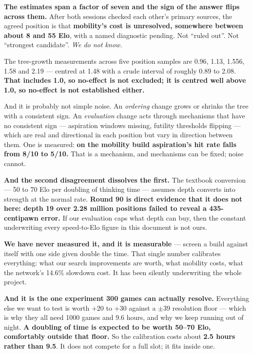 \documentclass[11pt,a4paper]{article}
\begin{document}
\textbf{The estimates span a factor of seven and the sign of the answer flips across them.}
After both sessions checked each other's primary sources, the agreed position is that
\textbf{mobility's cost is unresolved, somewhere between about 8 and 55 Elo}, with a named
diagnostic pending. Not ``ruled out''. Not ``strongest candidate''. \emph{We do not know.}

The tree-growth measurements across five position samples are 0.96, 1.13, 1.556, 1.58 and 2.19 ---
centred at 1.48 with a crude interval of roughly 0.89 to 2.08. \textbf{That includes 1.0, so
no-effect is not excluded; it is centred well above 1.0, so no-effect is not established either.}

And it is probably not simple noise. An \emph{ordering} change grows or shrinks the tree with a
consistent sign. An \emph{evaluation} change acts through mechanisms that have no consistent sign
--- aspiration windows missing, futility thresholds flipping --- which are real and directional in
each position but vary in direction between them. One is measured: \textbf{on the mobility build
aspiration's hit rate falls from 8/10 to 5/10.} That is a mechanism, and mechanisms can be fixed;
noise cannot.

\begin{keybox}
\textbf{And the second disagreement dissolves the first.} The textbook conversion --- 50 to 70 Elo
per doubling of thinking time --- assumes depth converts into strength at the normal rate.
\textbf{Round 90 is direct evidence that it does not here: depth 19 over 2.28 million positions
failed to reveal a 435-centipawn error.} If our evaluation caps what depth can buy, then the
constant underwriting every speed-to-Elo figure in this document is not ours.

\textbf{We have never measured it, and it is measurable} --- screen a build against itself with
one side given double the time. That single number calibrates everything: what our search
improvements are worth, what mobility costs, what the network's 14.6\% slowdown cost. It has been
silently underwriting the whole project.

\textbf{And it is the one experiment 300 games can actually resolve.} Everything else we want to
test is worth $+20$ to $+30$ against a $\pm39$ resolution floor --- which is why they all need
1000 games and 9.6 hours, and why we keep running out of night. \textbf{A doubling of time is
expected to be worth 50--70 Elo, comfortably outside that floor.} So the calibration costs about
\textbf{2.5 hours rather than 9.5}. It does not compete for a full slot; it fits inside one.
\end{keybox}
\end{document}
